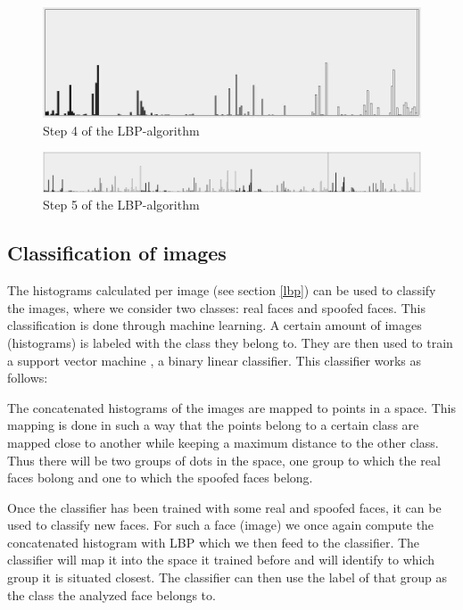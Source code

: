 \documentclass{sig-alternate-br}
\begin{document}
\begin{figure}[h]
	\includegraphics[scale=0.2]{histogram}
	\caption{Step 4  of the LBP-algorithm}
	\label{fig:histogram}
\end{figure}

\begin{figure}[h]
	\includegraphics[scale=0.1]{concat_histograms}
	\caption{Step 5 of the LBP-algorithm}
	\label{fig:concat_histograms}
\end{figure}

\subsection{Classification of images}
The histograms calculated per image (see section \ref{lbp}) can be used to classify the images, where we consider two classes: real faces and spoofed faces. This classification is done through machine learning. A certain amount of images (histograms) is labeled with the class they belong to. They are then used to train a support vector machine \cite{hsu2003practical}, a binary linear classifier. This classifier works as follows:

The concatenated histograms of the images are mapped to points in a space. This mapping is done in such a way that the points belong to a certain class are mapped close to another while keeping a maximum distance to the other class. Thus there will be two groups of dots in the space, one group to which the real faces bolong and one to which the spoofed faces belong.

Once the classifier has been trained with some real and spoofed faces, it can be used to classify new faces. For such a face (image) we once again compute the concatenated histogram with LBP which we then feed to the classifier. The classifier will map it into the space it trained before and will identify to which group it is situated closest. The classifier can then use the label of that group as the class the analyzed face belongs to.
\end{document}

